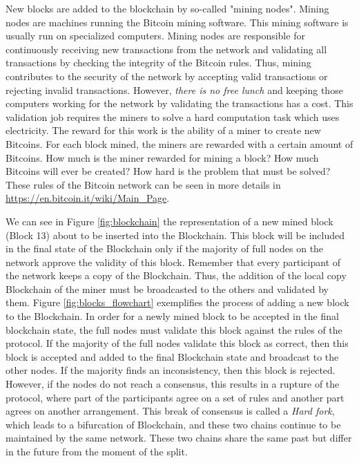 \documentclass[../../thesis.tex]{subfiles}
\begin{document}
New blocks are added to the blockchain by so-called "mining nodes". Mining nodes are machines running the Bitcoin mining software. This mining software is usually run on specialized computers. Mining nodes are responsible for continuously receiving new transactions from the network and validating all transactions by checking the integrity of the Bitcoin rules. Thus, mining contributes to the security of the network by accepting valid transactions or rejecting invalid transactions. However, \textit{there is no free lunch} and keeping those computers working for the network by validating the transactions has a cost. This validation job requires the miners to solve a hard computation task which uses electricity. The reward for this work is the ability of a miner to create new Bitcoins. For each block mined, the miners are rewarded with a certain amount of Bitcoins. How much is the miner rewarded for mining a block? How much Bitcoins will ever be created? How hard is the problem that must be solved? These rules of the Bitcoin network can be seen in more details in \url{https://en.bitcoin.it/wiki/Main_Page}.

We can see in Figure \ref{fig:blockchain} the representation of a new mined block (Block 13) about to be inserted into the Blockchain. This block will be included in the final state of the Blockchain only if the majority of full nodes on the network approve the validity of this block. Remember that every participant of the network keeps a copy of the Blockchain. Thus, the addition of the local copy Blockchain of the miner must be broadcasted to the others and validated by them. Figure \ref{fig:blocks_flowchart} exemplifies the process of adding a new block to the Blockchain.  In order for a newly mined block to be accepted in the final blockchain state, the full nodes must validate this block against the rules of the protocol. If the majority of the full nodes validate this block as correct, then this block is accepted and added to the final Blockchain state and broadcast to the other nodes. If the majority finds an inconsistency, then this block is rejected. However, if the nodes do not reach a consensus, this results in a rupture of the protocol, where part of the participants agree on a set of rules and another part agrees on another arrangement. This break of consensus is called a \textit{Hard fork}, which leads to a bifurcation of Blockchain, and these two chains continue to be maintained by the same network. These two chains share the same past but differ in the future from the moment of the split. 
\end{document}
